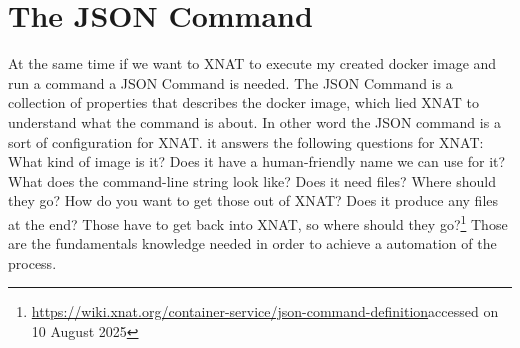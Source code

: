 \section{The JSON Command}
At the same time if we want to XNAT to execute my created docker image and run a command a \ac{JSON} Command is needed. The JSON  Command is a collection of properties that describes the docker image, which lied XNAT to understand what the command  is about. In other word the JSON command is a sort of configuration for XNAT. it answers the following  questions for XNAT: What kind of image is it? Does it have a human-friendly name we can use for it? What does the command-line string look like? Does it need files? Where should they go? How do you want to get those out of XNAT? Does it produce any files at the end? Those have to get back into XNAT, so where should they go?\footnote{\url{https://wiki.xnat.org/container-service/json-command-definition}accessed on 10 August 2025} Those are the fundamentals knowledge needed in order to achieve a automation of the process. 










